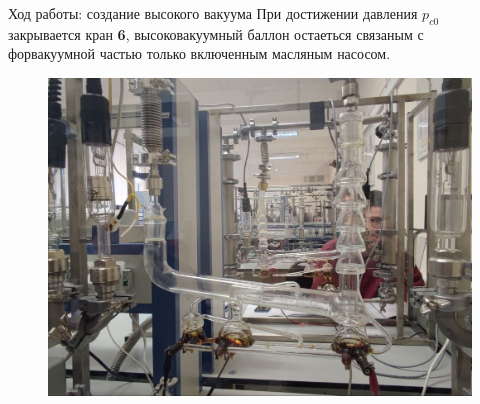 \documentclass[xcolor=table]{beamer}
\begin{document}
\begin{frame}{Ход работы: создание высокого вакуума}
    При достижении давления \(p_{c0}\) закрывается кран \textbf{6},  высоковакуумный баллон остаеться связаным с форвакуумной частью только включенным масляным насосом.
    \begin{figure}[h]
        \centering
        \includegraphics[scale = 0.15]{images/oil_valve.jpg}
    \end{figure}
\end{frame}
\end{document}
